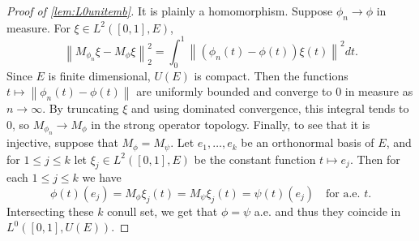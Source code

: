\documentclass{amsart}
\numberwithin{equation}{subsection}
\theoremstyle{plain}
\theoremstyle{definition}
\theoremstyle{plain}
\begin{document}
\begin{proof}[Proof of \cref{lem:L0unitemb}]
It is plainly a homomorphism. Suppose \(\phi_{n}\to\phi\) in measure. For \(\xi\in L^{2}\left(\left[0,1\right],E\right)\),
\[\left\|M_{\phi_{n}}\xi-M_{\phi}\xi\right\|_{2}^{2}=\int_{0}^{1}\left\|\left(\phi_{n}\left(t\right)-\phi\left(t\right)\right)\xi\left(t\right)\right\|^{2}dt.\]
Since \(E\) is finite dimensional, \(U\left(E\right)\) is compact. Then the functions \(t\mapsto\left\|\phi_{n}\left(t\right)-\phi\left(t\right)\right\|\) are uniformly bounded and converge to \(0\) in measure as \(n\to\infty\). By truncating \(\xi\) and using dominated convergence, this integral tends to \(0\), so \(M_{\phi_{n}}\to M_{\phi}\) in the strong operator topology. Finally, to see that it is injective, suppose that \(M_{\phi}=M_{\psi}\). Let \(e_{1},\dotsc,e_{k}\) be an orthonormal basis of \(E\), and for \(1\leq j\leq k\) let \(\xi_{j}\in L^{2}\left(\left[0,1\right],E\right)\) be the constant function \(t\mapsto e_{j}\). Then for each \(1\leq j\leq k\) we have
\[\phi\left(t\right)\left(e_{j}\right)=M_{\phi}\xi_{j}\left(t\right)=M_{\psi}\xi_{j}\left(t\right)=\psi\left(t\right)\left(e_{j}\right)\quad\text{for a.e. }t.\]
Intersecting these \(k\) conull set, we get that \(\phi=\psi\) a.e. and thus they coincide in \(L^{0}\left(\left[0,1\right],U\left(E\right)\right)\).
\end{proof}
\end{document}
